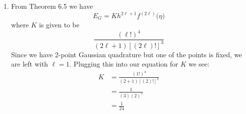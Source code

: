 \documentclass[11pt,a4paper]{article}
\begin{document}
\begin{itemize}
\begin{enumerate} [label={\alph*)}]
					Using our third formula and having equations in place for $w_1$ and $w_2$ we can solve for $\alpha$ as follows:
					\begin{align*}
					h\Big(x_i^2 + hx_i + \frac{1}{3}h^2 \Big) &= w_1x_i^2 + w_2z^2 \\
					&= (h-w_2)x_i^2 + w_2z^2 \\
					&= hx_i^2-w_2x_i^2 + w_2(x_i+\alpha h)^2 \\
					&= hx_i^2-w_2x_i^2 + w_2(x_i^2 + 2x_i \alpha h + \alpha^2 h^2) \\
					&= hx_i^2 + w_2(2x_i \alpha h + \alpha^2 h^2) \\
					&= hx_i^2 + \frac{h}{2\alpha}(2x_i \alpha h + \alpha^2 h^2) \\
					hx_i^2 + h^2x_i+\frac{h^3}{3} &= hx_i^2 + h^2x_i+\frac{h^3\alpha}{2} \\
					\frac{h^3}{3} &= \frac{h^3\alpha}{2} \\
					\alpha &= \frac{2}{3}
					\end{align*}
					\item From Theorem 6.5 we have $$E_G = Kh^{2\ell + 1}f^{(2\ell)}\big(\eta\big)$$ where $K$ is given to be $$\frac{(\ell!)^4}{(2\ell +1)[(2\ell)!]^3}$$ Since we have 2-point Gaussian quadrature but one of the points is fixed, we are left with $\ell = 1$. Plugging this into our equation for $K$ we see:
					\begin{align*}
						K &= \frac{(1!)^4}{(2+1)[(2)!]^3} \\
						  &= \frac{1}{(3)(2)^3} \\
						  &= \frac{1}{24}
					\end{align*}
				\end{enumerate}
		\end{itemize}	
	
\end{document}
